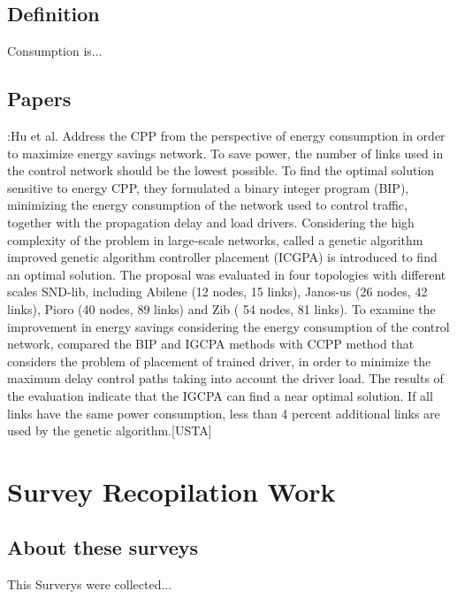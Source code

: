 \documentclass[a4paper,10pt]{article}
\begin{document}
\subsection{Definition}
Consumption is...

\subsection{Papers}
\cite{HuLu17}:Hu et al. Address the CPP from the perspective of energy consumption in order to maximize energy savings network. To save power, the number of links used in the control network should be the lowest possible. To find the optimal solution sensitive to energy CPP, they formulated a binary integer program (BIP), minimizing the energy consumption of the network used to control traffic, together with the propagation delay and load drivers. Considering the high complexity of the problem in large-scale networks, called a genetic algorithm improved genetic algorithm controller placement (ICGPA) is introduced to find an optimal solution.
The proposal was evaluated in four topologies with different scales SND-lib, including Abilene (12 nodes, 15 links), Janos-us (26 nodes, 42 links), Pioro (40 nodes, 89 links) and Zib ( 54 nodes, 81 links). To examine the improvement in energy savings considering the energy consumption of the control network, compared the BIP and IGCPA methods with CCPP method that considers the problem of placement of trained driver, in order to minimize the maximum delay control paths taking into account the driver load. The results of the evaluation indicate that the IGCPA can find a near optimal solution. If all links have the same power consumption, less than 4 percent additional links are used by the genetic algorithm.[USTA]


\section{Survey Recopilation Work}
\subsection{About these surveys}
This Surverys were collected...
\end{document}
